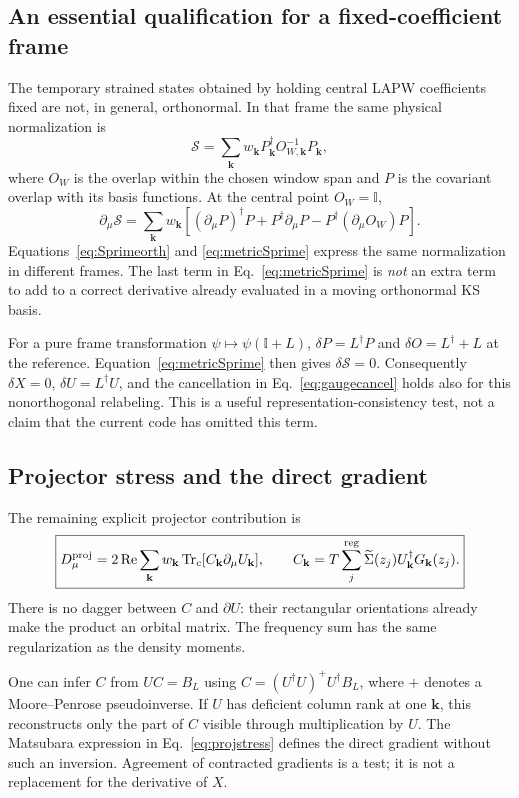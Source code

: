\documentclass[11pt]{article}
\newcommand{\Tr}{\operatorname{Tr}}
\newcommand{\Rea}{\operatorname{Re}}
\newcommand{\kb}{\mathbf k}
\newcommand{\Id}{\mathbb I}
\newcommand{\pa}{\partial_\mu}
\newcommand{\Sig}{\widetilde\Sigma}
\begin{document}
\subsection{An essential qualification for a fixed-coefficient frame}
The temporary strained states obtained by holding central LAPW
coefficients fixed are not, in general, orthonormal. In that frame the
same physical normalization is
\begin{equation}
 \mathcal S=\sum_\kb w_\kb P_\kb^\dagger O_{W,\kb}^{-1}P_\kb,
 \label{eq:metricS}
\end{equation}
where $O_W$ is the overlap within the chosen window span and $P$ is the
covariant overlap with its basis functions. At the central point $O_W=\Id$,
\begin{equation}
 \pa\mathcal S=\sum_\kb w_\kb\left[
 (\pa P)^\dagger P+P^\dagger\pa P-P^\dagger(\pa O_W)P\right].
 \label{eq:metricSprime}
\end{equation}
Equations~\eqref{eq:Sprimeorth} and \eqref{eq:metricSprime} express
the same normalization in different frames. The last term in
Eq.~\eqref{eq:metricSprime} is \emph{not} an extra term to add to a
correct derivative already evaluated in a moving orthonormal KS basis.

For a pure frame transformation $\psi\mapsto\psi(\Id+L)$,
$\delta P=L^\dagger P$ and $\delta O=L^\dagger+L$ at the reference.
Equation~\eqref{eq:metricSprime} then gives $\delta\mathcal S=0$.
Consequently $\delta X=0$, $\delta U=L^\dagger U$, and the cancellation
in Eq.~\eqref{eq:gaugecancel} holds also for this nonorthogonal
relabeling. This is a useful representation-consistency test, not a
claim that the current code has omitted this term.

\subsection{Projector stress and the direct gradient}
The remaining explicit projector contribution is
\begin{equation}
 \boxed{D_\mu^{\rm proj}
     =2\Rea\sum_\kb w_\kb\Tr_c[C_\kb\pa U_\kb],\qquad
 C_\kb=T\sum_j^{\rm reg}\Sig(z_j)U_\kb^\dagger G_\kb(z_j).}
 \label{eq:projstress}
\end{equation}
There is no dagger between $C$ and $\partial U$: their rectangular
orientations already make the product an orbital matrix. The frequency
sum has the same regularization as the density moments.

One can infer $C$ from $UC=B_L$ using
$C=(U^\dagger U)^+U^\dagger B_L$, where $+$ denotes a
Moore--Penrose pseudoinverse. If $U$ has deficient column rank at one
$\kb$, this reconstructs only the part of $C$ visible through multiplication
by $U$. The Matsubara expression in Eq.~\eqref{eq:projstress} defines
the direct gradient without such an inversion. Agreement of contracted
gradients is a test; it is not a replacement for the derivative of $X$.
\end{document}
